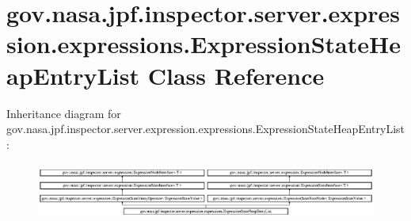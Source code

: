 \hypertarget{classgov_1_1nasa_1_1jpf_1_1inspector_1_1server_1_1expression_1_1expressions_1_1_expression_state_heap_entry_list}{}\section{gov.\+nasa.\+jpf.\+inspector.\+server.\+expression.\+expressions.\+Expression\+State\+Heap\+Entry\+List Class Reference}
\label{classgov_1_1nasa_1_1jpf_1_1inspector_1_1server_1_1expression_1_1expressions_1_1_expression_state_heap_entry_list}
Inheritance diagram for gov.\+nasa.\+jpf.\+inspector.\+server.\+expression.\+expressions.\+Expression\+State\+Heap\+Entry\+List\+:\begin{figure}[H]
\begin{center}
\leavevmode
\includegraphics[height=1.898305cm]{classgov_1_1nasa_1_1jpf_1_1inspector_1_1server_1_1expression_1_1expressions_1_1_expression_state_heap_entry_list}
\end{center}
\end{figure}
